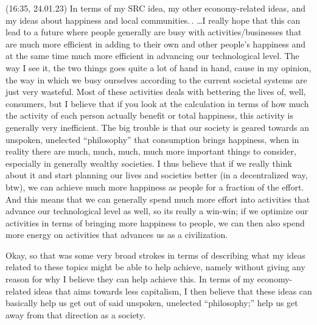 \documentclass{report}
\begin{document}
(16:35, 24.01.23) In terms of my SRC idea, my other economy-related ideas, and my ideas about happiness and local communities.\,. %
\ldots I really hope that this can lead to a future where people generally are busy with activities/businesses that are much more efficient in adding to their own and other people's happiness and at the same time much more efficient in advancing our technological level. The way I see it, the two things goes quite a lot of hand in hand, cause in my opinion, the way in which we busy ourselves according to the current societal systems are just very wasteful. Most of these activities deals with bettering the lives of, well, consumers, but I believe that if you look at the calculation in terms of how much the activity of each person actually benefit or total happiness, this activity is generally very inefficient. The big trouble is that our society is geared towards an unspoken, unelected ``philosophy'' that consumption brings happiness, when in reality there are much, much, much, much more important things to consider, especially in generally wealthy societies. I thus believe that if we really think about it and start planning our lives and societies better (in a decentralized way, btw), we can achieve much more happiness as people for a fraction of the effort. And this means that we can generally spend much more effort into activities that advance our technological level as well, so its really a win-win; if we optimize our activities in terms of bringing more happiness to people, we can then also spend more energy on activities that advances us as a civilization.

Okay, so that was some very broad strokes in terms of describing what my ideas related to these topics might be able to help achieve, namely without giving any reason for why I believe they can help achieve this. In terms of my economy-related ideas that aims towards less capitalism, I then believe that these ideas can basically help us get out of said unspoken, unelected ``philosophy;'' help us get away from that direction as a society. 
\end{document}
